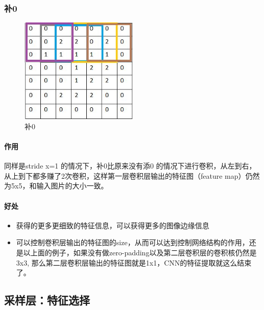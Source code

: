 \documentclass[UTF8]{ctexart}
\begin{document}
\subsubsection{补0}
\begin{figure}[htb]
	\centering
	\includegraphics[width=0.5\textwidth]{figures/zeropadding1.jpg}
	\caption{补0}
	\label{zeropadding1}
\end{figure}
\paragraph{作用}
同样是stride x=1 的情况下，补0比原来没有添0 的情况下进行卷积，从左到右，从上到下都多赚了2次卷积，这样第一层卷积层输出的特征图（feature map）仍然为5x5，和输入图片的大小一致。
\paragraph{好处}
\begin{itemize}
	\item 获得的更多更细致的特征信息，可以获得更多的图像边缘信息
	\item 可以控制卷积层输出的特征图的size，从而可以达到控制网络结构的作用，还是以上面的例子，如果没有做zero-padding以及第二层卷积层的卷积核仍然是3x3, 那么第二层卷积层输出的特征图就是1x1，CNN的特征提取就这么结束了。
\end{itemize}

\subsection{采样层：特征选择}
\end{document}
